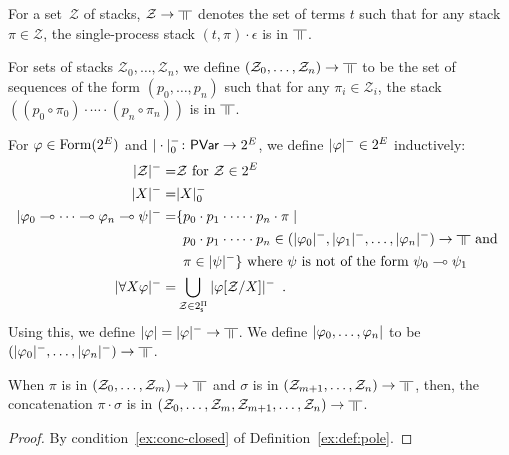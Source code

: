 For a set~$\mathcal Z$ of
stacks, $\mathcal Z\rightarrow\bbot$ denotes
the set of terms $t$ such that for any
stack $\pi\in\mathcal Z$,
the single-process stack $(t,\pi)\cdot\epsilon$ is in $\bbot$.

For sets of stacks $\mathcal Z_0,\ldots,\mathcal Z_n$,
we define $(\mathcal Z_0,\ldots,\mathcal Z_n)\rightarrow\bbot$ to be the
set of sequences of the form $(p_0,\ldots,p_n)$ such that
for any $\pi_i\in\mathcal Z_i$, the stack $((p_0\circ \pi_0)\cdot\cdots\cdot
(p_n\circ \pi_n))$ is in $\bbot$.


For $\varphi\in\mathop{\text{Form}}(2^E)$ and $|\cdot|^-_0\colon\mathsf{PVar}\rightarrow 2^E$\kern
-2pt,
we define $|{\varphi}|^-\in
2^E$ inductively:
\begin{align*}
 \nsem{\mathcal Z} =& \mathcal Z \text{ for } \mathcal Z\in 2^E\\
 \nsem{X}=& |X|_0^- \\
 \nsem{\phi_0\limp\cdots\limp\phi_n\limp\psi}=&
 \{p_0\cdot p_1\cdot\cdots\cdot p_n\cdot\pi\mid \\ &\,\,\,
 p_0\cdot p_1\cdot\cdots\cdot p_n
 \in(\nsem{\phi_0}, \nsem{\phi_1}, \ldots, \nsem{\phi_n})\rightarrow\bbot
 \text{ and  }
 \\&\,\,\,\pi\in\nsem\psi\}\text{ where }\psi\text{ is not of the form }\psi_0\limp\psi_1\\
 \nsem{\forall X\phi}=&
 \bigcup_{\mathcal Z\in 2^\sPi} \nsem{\phi[\mathcal Z/X]}\enspace.
\end{align*}
Using this, we define $\sem \phi=\nsem{\phi}\rightarrow\bbot$.
We define $|{\varphi_0,\ldots,\varphi_n}|$ to be
$(\nsem{\phi_0},\ldots,\nsem{\phi_n})\rightarrow\bbot$.
 \begin{proposition}
  \label{nsem-tuple}
  When $\pi$ is in
  $\left(\mathcal{Z}_0,\ldots,\mathcal{Z}_m\right)\rightarrow \bbot$
  and $\sigma$ is in
  $\left(\mathcal{Z}_{m+1},\ldots,\mathcal{Z}_n\right)\rightarrow \bbot$,
  then,
  the concatenation $\pi\cdot\sigma$ is in
  $\left(\mathcal{Z}_0,\ldots,\mathcal{Z}_m,
  \mathcal{Z}_{m+1},\ldots,\mathcal{Z}_n\right)\rightarrow\bbot$.
 \end{proposition}
  \begin{proof}
   By condition~\ref{ex:conc-closed} of Definition~\ref{ex:def:pole}.
  \end{proof}

